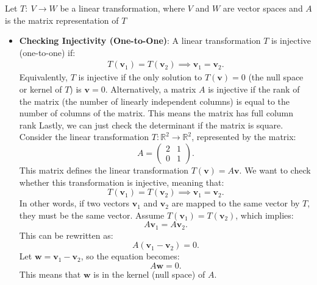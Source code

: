 \documentclass{report}
\begin{document}
\begin{itemize}
        \bigbreak \noindent 
        Let $T:\ V \to W$ be a linear transformation, where $V$ and $W$ are vector spaces and $A$ is the matrix representation of $T$
        \begin{itemize}
            \item \textbf{Checking Injectivity (One-to-One)}: A linear transformation $T$ is injective (one-to-one) if:
                \begin{align*}
                    T(\mathbf{v}_{1}) = T(\mathbf{v}_{2}) \implies \mathbf{v}_{1} = \mathbf{v}_{2}
                .\end{align*}
                \bigbreak \noindent 
                Equivalently, $T$ is injective if the only solution to $T(\mathbf{v})=0$ (the null space or kernel of $T$) is $\mathbf{v}=0$.
                \bigbreak \noindent 
                Alternatively, a matrix $A$ is injective if the rank of the matrix (the number of linearly independent columns) is equal to the number of columns of the matrix. This means the matrix has full column rank
                \bigbreak \noindent 
                Lastly, we can just check the determinant if the matrix is square.
                \bigbreak \noindent 
                Consider the linear transformation \( T: \mathbb{R}^2 \to \mathbb{R}^2 \), represented by the matrix:
                \[
                    A = \begin{pmatrix} 2 & 1 \\ 0 & 1 \end{pmatrix}.
                \]
                This matrix defines the linear transformation \( T(\mathbf{v}) = A \mathbf{v} \). We want to check whether this transformation is injective, meaning that:
                \[
                    T(\mathbf{v}_1) = T(\mathbf{v}_2) \implies \mathbf{v}_1 = \mathbf{v}_2.
                \]
                In other words, if two vectors \( \mathbf{v}_1 \) and \( \mathbf{v}_2 \) are mapped to the same vector by \( T \), they must be the same vector.
                \bigbreak \noindent 
                Assume \( T(\mathbf{v}_1) = T(\mathbf{v}_2) \), which implies:
                \[
                    A \mathbf{v}_1 = A \mathbf{v}_2.
                \]
                This can be rewritten as:
                \[
                    A (\mathbf{v}_1 - \mathbf{v}_2) = 0.
                \]
                Let \( \mathbf{w} = \mathbf{v}_1 - \mathbf{v}_2 \), so the equation becomes:
                \[
                    A \mathbf{w} = 0.
                \]
                This means that \( \mathbf{w} \) is in the kernel (null space) of \( A \).

\end{itemize}
\end{itemize}
\end{document}
